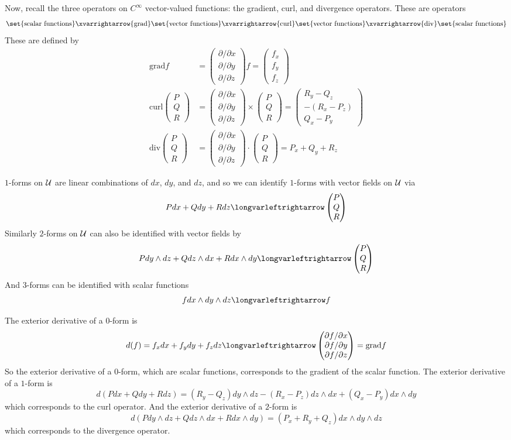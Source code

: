 \documentclass[10pt]{article}
\def\pmat#1{\begin{pmatrix} #1 \end{pmatrix}}
\def\pmat#1{\begin{pmatrix}#1\end{pmatrix}}
\def\mU{{\cal U}}
\begin{document}
Now, recall the three operators on $C^\infty$ vector-valued functions: the gradient, curl, and divergence operators.
These are operators
\[ \set{\text{scalar functions}}\xvarrightarrow{\mathrm{grad}}\set{\text{vector functions}}\xvarrightarrow{\mathrm{curl}}\set{\text{vector functions}}\xvarrightarrow{\mathrm{div}}
\set{\text{scalar functions}} \]
These are defined by
\def\grad{\mathrm{grad}} \def\curl{\mathrm{curl}} \def\div{\mathrm{div}}
\begin{align*}
    \grad f &= \pmat{\partial/\partial x \\ \partial/\partial y \\ \partial/\partial z}f = \pmat{f_x\\f_y\\f_z} \\
    \curl\pmat{P\\Q\\R} &= \pmat{\partial/\partial x \\ \partial/\partial y \\ \partial/\partial z}\times\pmat{P\\Q\\R} = \pmat{R_y-Q_z \\ -(R_x-P_z) \\ Q_x-P_y} \\
    \div\pmat{P\\Q\\R} &= \pmat{\partial/\partial x \\ \partial/\partial y \\ \partial/\partial z}\cdot\pmat{P\\Q\\R} = P_x+Q_y+R_z
\end{align*}

$1$-forms on $\mU$ are linear combinations of $dx$, $dy$, and $dz$, and so we can identify $1$-forms with vector fields on $\mU$ via
\[ Pdx + Qdy + Rdz \longvarleftrightarrow \pmat{P\\Q\\R} \]
Similarly $2$-forms on $\mU$ can also be identified with vector fields by
\[ Pdy\wedge dz + Qdz\wedge dx + Rdx\wedge dy \longvarleftrightarrow \pmat{P\\Q\\R} \]
And $3$-forms can be identified with scalar functions
\[ fdx\wedge dy\wedge dz \longvarleftrightarrow f \]

The exterior derivative of a $0$-form is
\[ d(f) = f_xdx + f_ydy + f_zdz \longvarleftrightarrow \pmat{\partial f/\partial x\\\partial f/\partial y\\\partial f/\partial z} = \grad f \]
So the exterior derivative of a $0$-form, which are scalar functions, corresponds to the gradient of the scalar function.
The exterior derivative of a $1$-form is
\[ d(Pdx + Qdy + Rdz) = (R_y-Q_z)dy\wedge dz - (R_x-P_z)dz\wedge dx + (Q_x-P_y)dx\wedge dy \]
which corresponds to the curl operator.
And the exterior derivative of a $2$-form is
\[ d(Pdy\wedge dz + Qdz\wedge dx + Rdx\wedge dy) = (P_x+R_y+Q_z)dx\wedge dy\wedge dz \]
which corresponds to the divergence operator.
\end{document}
